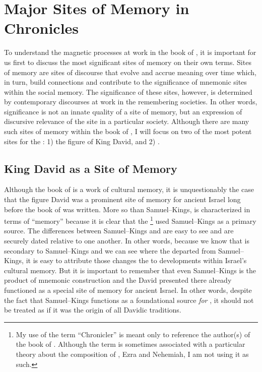 \section{Major Sites of Memory in Chronicles}

To understand the magnetic processes at work in the book of \chronicles, it is important for us first to discuss the most significant sites of memory on their own terms. Sites of memory are sites of discourse that evolve and accrue meaning over time which, in turn, build connections and contribute to the significance of mnemonic sites within the social memory. The significance of these sites, however, is determined by contemporary discourses at work in the remembering societies. In other words, significance is not an innate quality of a site of memory, but an expression of discursive relevance of the site in a particular society. Although there are many such sites of memory within the book of \chronicles, I will focus on two of the most potent sites for the \chronicler: 1) the figure of King David, and 2) \solomonstemple.

\subsection{King David as a Site of Memory}

Although the book of \chronicles is a work of cultural memory, it is unquestionably the case that the figure David was a prominent site of memory for ancient Israel long before the book of \chronicles was written. More so than Samuel--Kings, \chronicles is characterized in terms of ``memory'' because it is clear that the \chronicler%
    \footnote{My use of the term ``Chronicler'' is meant only to reference the author(s) of the book of \chronicles. Although the term is sometimes associated with a particular theory about the composition of \chronicles, Ezra and Nehemiah, I am not using it as such.}
used Samuel--Kings as a primary source. The differences between Samuel--Kings and \chronicles are easy to see and are securely dated relative to one another. In other words, because we know that \chronicles is secondary to Samuel--Kings and we can see where the \chronicler departed from Samuel--Kings, it is easy to attribute those changes the to developments within Israel's cultural memory. But it is important to remember that even Samuel--Kings is the product of mnemonic construction and the David presented there already functioned as a special site of memory for ancient Israel. In other words, despite the fact that Samuel--Kings functions as a foundational source \emph{for \chronicles}, it should not be treated as if it was the origin of all Davidic traditions.\autocite{frohlich_frohlich2019}

